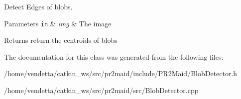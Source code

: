 Detect Edges of blobs. 


\begin{DoxyParams}[1]{Parameters}
\mbox{\tt in}  & {\em img} & The image\\
\hline
\end{DoxyParams}
\begin{DoxyReturn}{Returns}
return the centroids of blobs 
\end{DoxyReturn}


The documentation for this class was generated from the following files\+:\begin{DoxyCompactItemize}
\item 
/home/vendetta/catkin\+\_\+ws/src/pr2maid/include/\+P\+R2\+Maid/Blob\+Detector.\+h\item 
/home/vendetta/catkin\+\_\+ws/src/pr2maid/src/Blob\+Detector.\+cpp\end{DoxyCompactItemize}
